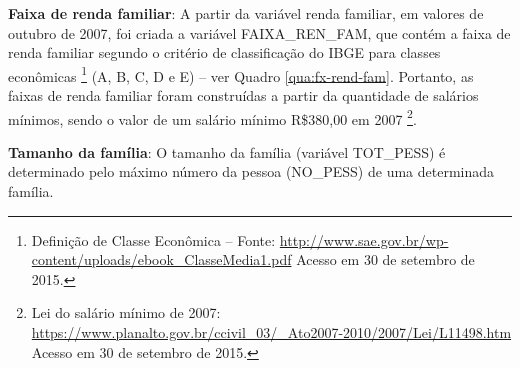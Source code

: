 \begin{compactitem}

\item \textbf{Faixa de renda familiar}: A partir da variável renda familiar, em valores de outubro de 2007, foi criada a variável FAIXA_REN_FAM, que contém a faixa de renda familiar segundo o critério de classificação do IBGE para classes econômicas%
\footnote{Definição de Classe Econômica – Fonte: \url{http://www.sae.gov.br/wp-content/uploads/ebook_ClasseMedia1.pdf} Acesso em 30 de setembro de 2015.} (A, B, C, D e E) – ver Quadro \ref{qua:fx-rend-fam}. Portanto, as faixas de renda familiar foram construídas a partir da quantidade de salários mínimos, sendo o valor de um salário mínimo R\$380,00 em 2007%
\footnote{Lei do salário mínimo de 2007: \url{ https://www.planalto.gov.br/ccivil_03/_Ato2007-2010/2007/Lei/L11498.htm} Acesso em 30 de setembro de 2015.}.
    
    \begin{quadro}[htb]
\end{quadro}

\item \textbf{Tamanho da família}: O tamanho da família (variável TOT_PESS) é determinado pelo máximo número da pessoa (NO_PESS) de uma determinada família.\\


\end{compactitem}
